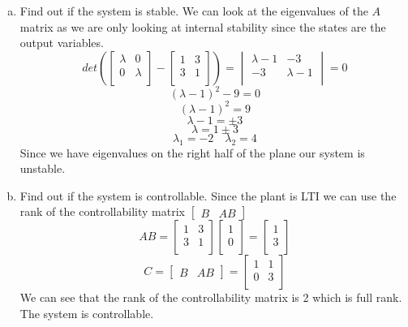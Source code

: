 \documentclass{article}
\begin{document}
\begin{enumerate}[a.]
\item Find out if the system is stable.
\newline
We can look at the eigenvalues of the $A$ matrix as we are only looking at internal stability since the states are the output variables.
$$
det(
\begin{bmatrix}
\lambda & 0 \\
0 & \lambda \\
\end{bmatrix}
-
\begin{bmatrix}
1 & 3 \\
3 & 1 \\
\end{bmatrix}
)=
\begin{vmatrix}
\lambda-1 & -3 \\
-3 & \lambda-1 \\
\end{vmatrix}
=0
$$
$$(\lambda-1)^2 -9 = 0$$
$$(\lambda-1)^2 = 9$$
$$\lambda-1 = \pm 3$$
$$\lambda = 1 \pm 3$$
$$\lambda_1 = -2 \quad \lambda_2 = 4 $$
Since we have eigenvalues on the right half of the plane our system is unstable.

\item Find out if the system is controllable.
\newline
Since the plant is LTI we can use the rank of the controllability matrix $\begin{bmatrix}B & AB\end{bmatrix}$
$$
AB =
\begin{bmatrix}
1 & 3 \\
3 & 1 \\
\end{bmatrix}
\begin{bmatrix}
1 \\
0 \\
\end{bmatrix}
=
\begin{bmatrix}
1 \\
3 \\
\end{bmatrix}
$$
$$
C = \begin{bmatrix}B & AB\end{bmatrix} =
\begin{bmatrix}
1 & 1 \\
0 & 3 \\
\end{bmatrix}
$$
We can see that the rank of the controllability matrix is 2 which is full rank. The system is controllable.


\end{enumerate}
\end{document}
